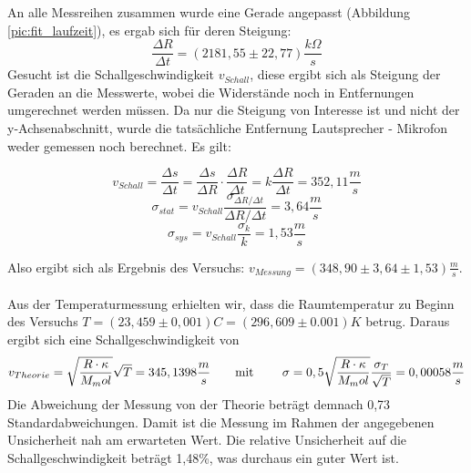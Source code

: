 \documentclass[a4paper]{article}
\begin{document}
	An alle Messreihen zusammen wurde eine Gerade angepasst (Abbildung \ref{pic:fit_laufzeit}), es ergab sich für deren Steigung:
	\begin{equation}
	\frac{\Delta R}{\Delta t} = (2181,55 \pm 22,77) \frac{k\Omega}{s}
	\end{equation} 
	Gesucht ist die Schallgeschwindigkeit $v_{Schall}$, diese ergibt sich als Steigung der Geraden an die Messwerte, wobei die Widerstände noch in Entfernungen umgerechnet werden müssen. Da nur die Steigung von Interesse ist und nicht der y-Achsenabschnitt, wurde die tatsächliche  Entfernung Lautsprecher - Mikrofon weder gemessen noch berechnet. Es gilt:
	
	\begin{equation}
	v_{Schall} = \frac{\Delta s}{\Delta t} = \frac{\Delta s}{\Delta R} \cdot \frac{\Delta R}{\Delta t} = k \frac{\Delta R}{\Delta t} = 352,11 \frac{m}{s}
	\end{equation}
	\begin{equation}
	\sigma_{stat} = v_{Schall} \frac{\sigma _{\Delta R / \Delta t}}{\Delta R / \Delta t} = 3,64 \frac{m}{s}
	\end{equation}
	\begin{equation}
	\sigma_{sys} = v_{Schall} \frac{\sigma _k}{k} = 1,53 \frac{m}{s}
	\end{equation}
	
	Also ergibt sich als Ergebnis des Versuchs: $v_{Messung} = (348,90 \pm 3,64 \pm 1,53) \frac{m}{s}$. \\\\
	Aus der Temperaturmessung erhielten wir, dass die Raumtemperatur zu Beginn des Versuchs $T = (23,459 \pm 0,001)C = (296,609 \pm 0.001)K$ betrug.
	Daraus ergibt sich eine Schallgeschwindigkeit von
	\begin{equation}
	v_{Theorie} =\sqrt{\frac{R\cdot\kappa}{M_mol}}\sqrt{T} = 345,1398 \frac{m}{s} \text{\qquad mit \qquad}
	\sigma = 0,5 \sqrt{\frac{R\cdot\kappa}{M_mol}} \frac{\sigma_T}{\sqrt{T}} = 0,00058 \frac{m}{s}
	\end{equation}
	Die Abweichung der Messung von der Theorie beträgt demnach 0,73 Standardabweichungen. Damit ist die Messung im Rahmen der angegebenen Unsicherheit nah am erwarteten Wert. Die relative Unsicherheit auf die Schallgeschwindigkeit beträgt 1,48\%, was durchaus ein guter Wert ist.
	
\end{document}
